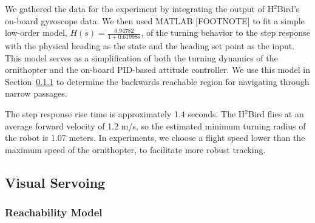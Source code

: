 \documentclass{aamas2013}
\begin{document}
We gathered the data for the experiment by integrating the output of 
H$^2$Bird's on-board gyroscope data. We then used MATLAB [FOOTNOTE] to fit a 
simple low-order model, $H(s) = \frac{0.94782}{1+0.61998s}$, of the turning 
behavior to the step response with the physical heading as the state and the 
heading set point as the input. This model serves as a simplification of 
both the turning dynamics of the ornithopter and the on-board PID-based 
attitude controller. We use this model in Section~\ref{sec:visual_servoing} 
to determine the backwards reachable region for navigating through narrow passages.

The step response rise time is approximately 1.4 seconds. The H$^2$Bird
flies at an average forward velocity of 1.2 m/s, so the estimated minimum
turning radius of the robot is 1.07 meters. In experiments, we choose a flight
speed lower than the maximum speed of the ornithopter, to facilitate more
robust tracking.

\subsection{Visual Servoing}
\label{sec:visual_servoing}

\subsubsection{Reachability Model}
\label{sec:visual_servoing}
\end{document}

